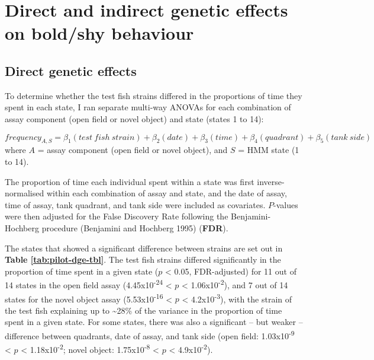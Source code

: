 \documentclass[
]{book}
\begin{document}
\hypertarget{direct-and-indirect-genetic-effects-on-boldshy-behaviour}{%
\section{Direct and indirect genetic effects on bold/shy behaviour}\label{direct-and-indirect-genetic-effects-on-boldshy-behaviour}}

\hypertarget{direct-genetic-effects}{%
\subsection{Direct genetic effects}\label{direct-genetic-effects}}

To determine whether the test fish strains differed in the proportions of time they spent in each state, I ran separate multi-way ANOVAs for each combination of assay component (open field or novel object) and state (states 1 to 14):

\[
frequency_{A,S} = \beta_{1}(test~fish~strain) + \beta_{2}(date) + \beta_{3}(time) + \beta_{4}(quadrant) + \beta_{5}(tank~side)
\]
where \(A\) = assay component (open field or novel object), and \(S\) = HMM state (1 to 14).

The proportion of time each individual spent within a state was first inverse-normalised within each combination of assay and state, and the date of assay, time of assay, tank quadrant, and tank side were included as covariates. \(P\)-values were then adjusted for the False Discovery Rate following the Benjamini-Hochberg procedure (Benjamini and Hochberg 1995) (\textbf{FDR}).

The states that showed a significant difference between strains are set out in \textbf{Table \ref{tab:pilot-dge-tbl}}. The test fish strains differed significantly in the proportion of time spent in a given state (\(p\) \textless{} 0.05, FDR-adjusted) for 11 out of 14 states in the open field assay (4.45x10\textsuperscript{-24} \textless{} \(p\) \textless{} 1.06x10\textsuperscript{-2}), and 7 out of 14 states for the novel object assay (5.53x10\textsuperscript{-16} \textless{} \(p\) \textless{} 4.2x10\textsuperscript{-3}), with the strain of the test fish explaining up to \textasciitilde28\% of the variance in the proportion of time spent in a given state. For some states, there was also a significant -- but weaker -- difference between quadrants, date of assay, and tank side (open field: 1.03x10\textsuperscript{-9} \textless{} \(p\) \textless{} 1.18x10\textsuperscript{-2}; novel object: 1.75x10\textsuperscript{-8} \textless{} \(p\) \textless{} 4.9x10\textsuperscript{-2}).
\end{document}

